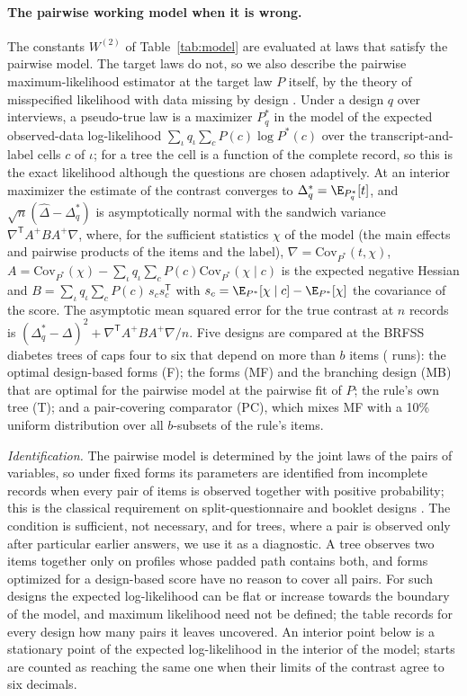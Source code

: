 \paragraph{The pairwise working model when it is wrong.}\label{app:misspec}
The constants $W^{(2)}$ of Table~\ref{tab:model} are evaluated at laws that satisfy the pairwise model. The target laws do not, so we also describe the pairwise maximum-likelihood estimator at the target law $P$ itself, by the theory of misspecified likelihood with data missing by design \citep{white1982,golden2019}. Under a design $q$ over interviews, a pseudo-true law is a maximizer $P^\ast_q$ in the model of the expected observed-data log-likelihood $\sum_\iota q_\iota\sum_c P(c)\log P^\ast(c)$ over the transcript-and-label cells $c$ of $\iota$; for a tree the cell is a function of the complete record, so this is the exact likelihood although the questions are chosen adaptively. At an interior maximizer the estimate of the contrast converges to $\Delta^\ast_q=\E_{P^\ast_q}[t]$, and $\sqrt n(\hat\Delta-\Delta^\ast_q)$ is asymptotically normal with the sandwich variance $\nabla^{\mathsf T}A^{+}BA^{+}\nabla$, where, for the sufficient statistics $\chi$ of the model (the main effects and pairwise products of the items and the label), $\nabla=\mathrm{Cov}_{P^\ast}(t,\chi)$, $A=\mathrm{Cov}_{P^\ast}(\chi)-\sum_\iota q_\iota\sum_cP(c)\mathrm{Cov}_{P^\ast}(\chi\mid c)$ is the expected negative Hessian and $B=\sum_\iota q_\iota\sum_cP(c)\,s_cs_c^{\mathsf T}$ with $s_c=\E_{P^\ast}[\chi\mid c]-\E_{P^\ast}[\chi]$ the covariance of the score. The asymptotic mean squared error for the true contrast at $n$ records is $(\Delta^\ast_q-\Delta)^2+\nabla^{\mathsf T}A^{+}BA^{+}\nabla/n$. Five designs are compared at the BRFSS diabetes trees of caps four to six that depend on more than $b$ items (\nMisRuns{} runs): the optimal design-based forms (F); the forms (MF) and the branching design (MB) that are optimal for the pairwise model at the pairwise fit of $P$; the rule's own tree (T); and a pair-covering comparator (PC), which mixes MF with a 10\% uniform distribution over all $b$-subsets of the rule's items.

\emph{Identification.} The pairwise model is determined by the joint laws of the pairs of variables, so under fixed forms its parameters are identified from incomplete records when every pair of items is observed together with positive probability; this is the classical requirement on split-questionnaire and booklet designs \citep{raghunathan1995,rhemtulla2012}. The condition is sufficient, not necessary, and for trees, where a pair is observed only after particular earlier answers, we use it as a diagnostic. A tree observes two items together only on profiles whose padded path contains both, and forms optimized for a design-based score have no reason to cover all pairs. For such designs the expected log-likelihood can be flat or increase towards the boundary of the model, and maximum likelihood need not be defined; the table records for every design how many pairs it leaves uncovered. An interior point below is a stationary point of the expected log-likelihood in the interior of the model; starts are counted as reaching the same one when their limits of the contrast agree to six decimals.

